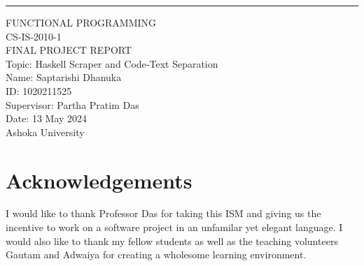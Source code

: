 \documentclass{scrreprt}
\begin{document}












\begin{flushright}
    \rule{16cm}{5pt}\vskip1cm
    \begin{bfseries}
        \Huge{FUNCTIONAL PROGRAMMING \\ CS-IS-2010-1 \\ FINAL PROJECT REPORT }\\
        \vspace{1.1cm}
        Topic: Haskell Scraper and Code-Text Separation\\
        \vspace{1.1cm}
        Name: Saptarishi Dhanuka\\
        \vspace{1.1cm}
        ID: 1020211525\\
        \vspace{1.1cm}
        Supervisor: Partha Pratim Das\\
        \vspace{1.1cm}
        Date: 13 May 2024\\
        \vspace{1.1cm}
        Ashoka University\\
    \end{bfseries}
\end{flushright}

\tableofcontents


\chapter{Acknowledgements}

I would like to thank Professor Das for taking this ISM and giving us the incentive to work on a software project in an unfamilar yet elegant language. I would also like to thank my fellow students as well as the teaching volunteers Gautam and Adwaiya for creating a wholesome learning environment. 
\end{document}
